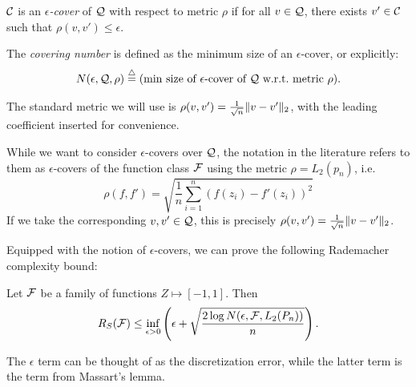 \begin{definition}
$\mathcal C$ is an \emph{$\epsilon$-cover} of $\mathcal Q$ with respect to metric $\rho$ if for all $v\in \mathcal Q$, there exists $v'\in \mathcal C $ such that $\rho(v,v')\le \epsilon$.
\end{definition}

\begin{definition}
The \emph{covering number} is defined as the minimum size of an $\epsilon$-cover, or explicitly:
$$N(\epsilon, \mathcal Q, \rho) \overset \triangle = (\text{min size of $\epsilon$-cover of $\mathcal Q$ w.r.t.\ metric $\rho$}).$$
\end{definition}

The standard metric we will use is $\rho(v,v') = \frac 1 {\sqrt{n}} \|v-v'\|_2$, with the leading coefficient inserted for convenience.

\begin{remark}
While we want to consider $\epsilon$-covers over $\mathcal Q$, the notation in the literature refers to them as $\epsilon$-covers of the function class $\mathcal F$ using the metric $\rho = L_2(p_n)$, i.e.
\begin{equation}
\rho(f,f') = \sqrt{ \frac 1 n \sum_{i=1}^n (f(z_i) - f'(z_i))^2 }
\end{equation}
If we take the corresponding $v,v'\in \mathcal Q$, this is precisely $\rho(v,v') = \frac 1 {\sqrt{n}} \|v-v'\|_2$.
\end{remark}

Equipped with the notion of $\epsilon$-covers, we can prove the following Rademacher complexity bound:

\begin{theorem}
Let $\mathcal F$ be a family of functions $Z \mapsto [-1,1]$. Then
\begin{equation}
R_S(\mathcal F) \le \inf_{\epsilon > 0} \left( \epsilon + \sqrt{ \frac {2\log N(\epsilon, \mathcal F, L_2(P_n))} n } \right). \label{lec8:eqn:rc-covering-bd}
\end{equation}
\end{theorem}

The $\epsilon$ term can be thought of as the discretization error, while the latter term is the term from Massart's lemma.

